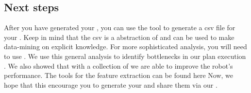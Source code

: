 \subsection{Next steps}
After you have generated your \neem, you can use the tool  to generate a csv file for your \neem.
Keep in mind that the csv is a abstraction of \neemnar and can be used to make data-mining on explicit knowledge.
For more sophisticated analysis, you will need to use \knowrob {}. 
We use this general analysis to identify bottlenecks in our plan execution .
We also showed that with a collection of \neems we are able to improve the robot's performance.
The tools for the feature extraction can be found here 
Now, we hope that this encourage you to generate your \neems and share them via our \neemhub.


